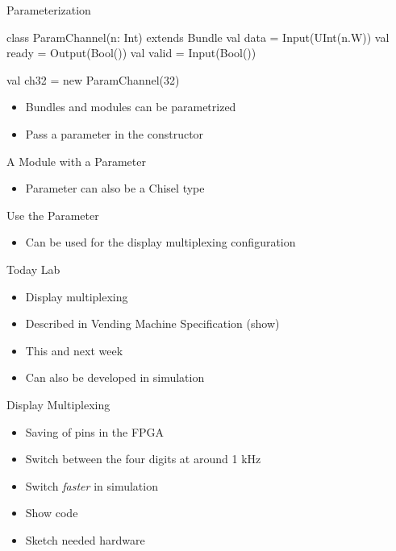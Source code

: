 \begin{frame}[fragile]{Parameterization}
\begin{chisel}
class ParamChannel(n: Int) extends Bundle {
  val data = Input(UInt(n.W))
  val ready = Output(Bool())
  val valid = Input(Bool())
}

val ch32 = new ParamChannel(32)
\end{chisel}
\begin{itemize}
\item Bundles and modules can be parametrized
\item Pass a parameter in the constructor
\end{itemize}

\end{frame}
\begin{frame}[fragile]{A Module with a Parameter}
\begin{itemize}
\item Parameter can also be a Chisel type
\end{itemize}
\end{frame}

\begin{frame}[fragile]{Use the Parameter}
\begin{itemize}
\item Can be used for the display multiplexing configuration
\end{itemize}
\end{frame}

\begin{frame}[fragile]{Today Lab}
\begin{itemize}
\item Display multiplexing
\item Described in Vending Machine Specification (show)
\item This and next week
\item Can also be developed in simulation
\end{itemize}
\end{frame}

\begin{frame}[fragile]{Display Multiplexing}
\begin{itemize}
\item Saving of pins in the FPGA
\item Switch between the four digits at around 1 kHz
\item Switch \emph{faster} in simulation
\item Show code
\item Sketch needed hardware
\end{itemize}
\end{frame}



